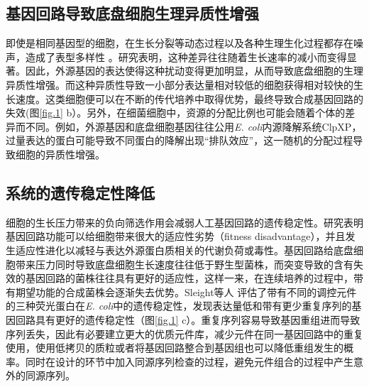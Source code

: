 \documentclass[b5paper,9pt,oneolumn,twoside,UTF8]{article}
\begin{document}
\subsection{基因回路导致底盘细胞生理异质性增强}
\indent 即使是相同基因型的细胞，在生长分裂等动态过程以及各种生理生化过程都存在噪声，造成了表型多样性 \cite{10.1103/physrevlett.114.078101, Wang:2011b4f, 10.1038/s41564-018-0161-3}。研究表明，这种差异往往随着生长速率的减小而变得显著\cite{Thomas2018, kim2020trade}。因此，外源基因的表达使得这种扰动变得更加明显，从而导致底盘细胞的生理异质性增强。而这种异质性导致一小部分表达量相对较低的细胞获得相对较快的生长速度。这类细胞便可以在不断的传代培养中取得优势，最终导致合成基因回路的失效\cite{Tan2009}(图\ref{fig.1} b）。另外，在细菌细胞中，资源的分配比例也可能会随着个体的差异而不同。例如，外源基因和底盘细胞基因往往公用\emph{E. coli}内源降解系统ClpXP，过量表达的蛋白可能导致不同蛋白的降解出现“排队效应”，这一随机的分配过程导致细胞的异质性增强\cite{Cookson2011a}。
\subsection{系统的遗传稳定性降低}
细胞的生长压力带来的负向筛选作用会减弱人工基因回路的遗传稳定性。研究表明基因回路功能可以给细胞带来很大的适应性劣势（fitness disadvantage）\cite{Sleight2013}，并且发生适应性进化以减轻与表达外源蛋白质相关的代谢负荷或毒性。基因回路给底盘细胞带来压力同时导致底盘细胞生长速度往往低于野生型菌株，而突变导致的含有失效的基因回路的菌株往往具有更好的适应性，这样一来，在连续培养的过程中，带有期望功能的合成菌株会逐渐失去优势。Sleight等人\cite{Sleight2013} 评估了带有不同的调控元件的三种荧光蛋白在\emph{E. coli}中的遗传稳定性，发现表达量低和带有更少重复序列的基因回路具有更好的遗传稳定性（图\ref{fig.1} c）。重复序列容易导致基因重组进而导致序列丢失，因此有必要建立更大的优质元件库，减少元件在同一基因回路中的重复使用，使用低拷贝的质粒或者将基因回路整合到基因组也可以降低重组发生的概率\cite{10.1016/j.molcel.2016.06.006}。同时在设计的环节中加入同源序列检查的过程，避免元件组合的过程中产生意外的同源序列。%
\end{document}
